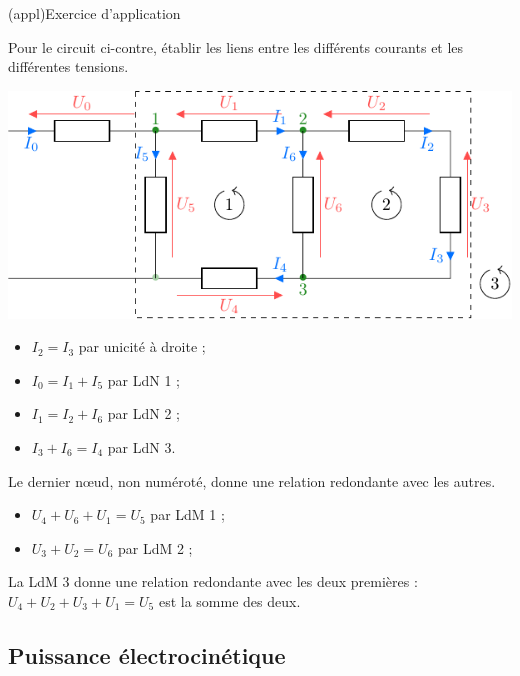 \documentclass[../../main/main.tex]{subfiles}
\begin{document}
\begin{tcb}[breakable](appl){Exercice d'application}

	\begin{minipage}{0.30\linewidth}
		Pour le circuit ci-contre, établir les liens entre les différents
		courants et les différentes tensions.
	\end{minipage}
	\begin{minipage}{0.70\linewidth}
		\includegraphics[width=\linewidth]{exer_ldnm}
	\end{minipage}
	\tcblower
	\begin{minipage}{0.47\linewidth}
		\begin{itemize}
			\item $I_2 = I_3$ par unicité à droite ;
			\item $I_0 = I_1 + I_5$ par LdN 1 ;
			\item $I_1 = I_2 + I_6$ par LdN 2 ;
			\item $I_3 + I_6 = I_4$ par LdN 3.
		\end{itemize}
		Le dernier nœud, non numéroté, donne une relation redondante avec les
		autres.
	\end{minipage}
	\hfill
	\begin{minipage}{0.47\linewidth}
		\begin{itemize}
			\item $U_4 + U_6 + U_1 = U_5$ par LdM 1 ;
			\item $U_3 + U_2 = U_6$ par LdM 2 ;
		\end{itemize}
		La LdM 3 donne une relation redondante avec les deux premières : $U_4
			+ U_2 + U_3 + U_1 = U_5$ est la somme des deux.
	\end{minipage}
\end{tcb}

\subsection{Puissance électrocinétique}
\end{document}
